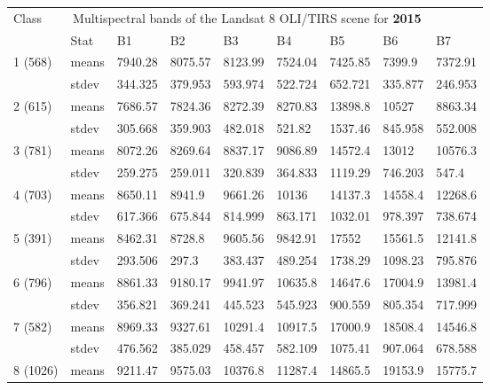 \documentclass[jmse,article,submit,pdftex,moreauthors]{Definitions/mdpi}
\begin{document}
\begin{table}[H]
  \centering
  \begin{tabularx}{\linewidth}{p{1.3cm}p{1.0cm}p{1.0cm}p{1.0cm}p{1.0cm}p{1.0cm}p{1.0cm}p{1.0cm}p{1.0cm}}
  \toprule
  \multirow{2}{*}{Class} & \multicolumn{7}{c}{Multispectral bands of the Landsat 8 OLI/TIRS scene for \textbf{2015}} \\
    & Stat & B1 & B2 & B3 & B4 & B5 & B6 & B7 \\
    \midrule
    \multirow{2}{*}{1 (568)} & means & 7940.28 & 8075.57 & 8123.99 & 7524.04 & 7425.85 & 7399.9 &7372.91 \\
    & stdev & 344.325 & 379.953 & 593.974 & 522.724 & 652.721 & 335.877 & 246.953 \\
    \midrule
    \multirow{2}{*}{2 (615)} & means & 7686.57 & 7824.36 & 8272.39 & 8270.83 & 13898.8 & 10527 & 8863.34 \\
    & stdev & 305.668 & 359.903 & 482.018 & 521.82 & 1537.46 & 845.958 & 552.008 \\
    \midrule
    \multirow{2}{*}{3 (781)} & means & 8072.26 & 8269.64 & 8837.17 & 9086.89 & 14572.4 & 13012 & 10576.3 \\
    & stdev & 259.275 & 259.011 & 320.839 & 364.833 & 1119.29 & 746.203 & 547.4 \\
    \midrule
    \multirow{2}{*}{4 (703)} & means & 8650.11 &8941.9 & 9661.26 & 10136 & 14137.3 & 14558.4 & 12268.6 \\
    & stdev & 617.366 & 675.844 & 814.999 & 863.171 & 1032.01 & 978.397 & 738.674 \\
    \midrule
    \multirow{2}{*}{5 (391)} & means & 8462.31 & 8728.8 & 9605.56 & 9842.91 & 17552 & 15561.5 & 12141.8 \\
    & stdev & 293.506 & 297.3 & 383.437 & 489.254 & 1738.29 & 1098.23 & 795.876 \\
    \midrule
    \multirow{2}{*}{6 (796)} & means & 8861.33 & 9180.17 & 9941.97 & 10635.8 & 14647.6 & 17004.9 & 13981.4 \\
    & stdev & 356.821 & 369.241 & 445.523 & 545.923 & 900.559 & 805.354 & 717.999 \\
    \midrule
    \multirow{2}{*}{7 (582)} & means & 8969.33 & 9327.61 & 10291.4 & 10917.5 & 17000.9 & 18508.4 & 14546.8 \\
    & stdev & 476.562 & 385.029 & 458.457 & 582.109 & 1075.41 & 907.064 & 678.588\\
    \midrule
    \multirow{2}{*}{8 (1026)} & means & 9211.47 & 9575.03 & 10376.8 & 11287.4 & 14865.5 & 19153.9 & 15775.7 \\

\end{tabularx}
\end{table}
\end{document}
